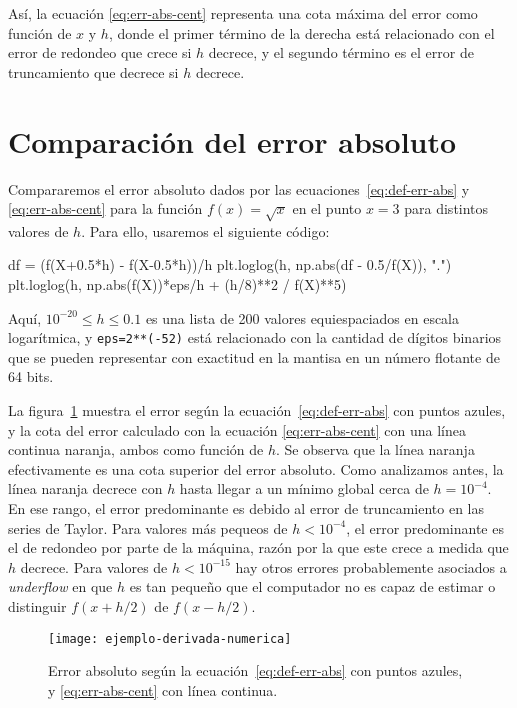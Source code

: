 \documentclass[../portafolio.tex]{subfiles}
\begin{document}
Así, la ecuación \eqref{eq:err-abs-cent} representa una cota máxima del error como función de $x$ y $h$, donde el primer término de la derecha está relacionado con el error de redondeo que crece si $h$ decrece, y el segundo término es el error de truncamiento que decrece si $h$ decrece.

\section{Comparación del error absoluto}
Compararemos el error absoluto dados por las ecuaciones~\eqref{eq:def-err-abs} y \eqref{eq:err-abs-cent} para la función $f(x)=\sqrt{x}$ en el punto $x=3$ para distintos valores de $h$. Para ello, usaremos el siguiente código:
\begin{pythoncode}
df = (f(X+0.5*h) - f(X-0.5*h))/h
plt.loglog(h, np.abs(df - 0.5/f(X)), ".")
plt.loglog(h, np.abs(f(X))*eps/h + (h/8)**2 / f(X)**5)
\end{pythoncode}

Aquí, $10^{-20}\leq h\leq 0.1$ es una lista de 200 valores equiespaciados en escala logarítmica, y \texttt{eps=2**(-52)} está relacionado con la cantidad de dígitos binarios que se pueden representar con exactitud en la mantisa en un número flotante de 64 bits.

La figura~\ref{fig:ejemplo_derivada_numerica} muestra el error según
la ecuación~\eqref{eq:def-err-abs} con puntos azules, y la cota del
error calculado con la ecuación \eqref{eq:err-abs-cent} con una línea
continua naranja, ambos como función de $h$. Se observa que la línea naranja efectivamente es una cota superior del error absoluto. Como analizamos antes, la línea naranja decrece con $h$ hasta llegar a un mínimo global cerca de $h=10^{-4}$. En ese rango, el error predominante es debido al error de truncamiento en las series de Taylor. Para valores más pequeos de $h<10^{-4}$, el error predominante es el de redondeo por parte de la máquina, razón por la que este crece a medida que $h$ decrece. Para valores de $h<10^{-15}$ hay otros errores probablemente asociados a \textit{underflow} en que $h$ es tan pequeño que el computador no es capaz de estimar o distinguir $f(x+h/2)$ de $f(x-h/2)$. 
\begin{figure}[ht!]
  \centering
  \texttt{[image: ejemplo-derivada-numerica]}
  \caption{Error absoluto según la ecuación~\eqref{eq:def-err-abs} con puntos azules, y \eqref{eq:err-abs-cent} con línea continua.}
  \label{fig:ejemplo_derivada_numerica}
\end{figure}
\end{document}
